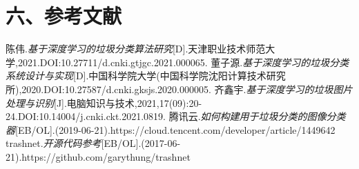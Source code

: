 \documentclass[12pt, a4paper, oneside]{ctexart}
\begin{document}
\newpage
\begingroup
\section*{六、参考文献}
\renewcommand{\section}[2]{}
\begin{thebibliography}{99}
    \addtolength{\itemsep}{-1.5ex}
    陈伟.\emph{基于深度学习的垃圾分类算法研究}[D].天津职业技术师范大学,2021.DOI:10.27711/d.cnki.gtjgc.2021.000065.
    董子源.\emph{基于深度学习的垃圾分类系统设计与实现}[D].中国科学院大学(中国科学院沈阳计算技术研究所),2020.DOI:10.27587/d.cnki.gksjs.2020.000005.
    齐鑫宇.\emph{基于深度学习的垃圾图片处理与识别}[J].电脑知识与技术,2021,17(09):20-24.DOI:10.14004/j.cnki.ckt.2021.0819.
    腾讯云.\emph{如何构建用于垃圾分类的图像分类器}[EB/OL].(2019-06-21).https://cloud.tencent.com/developer/article/1449642
    trashnet.\emph{开源代码参考}[EB/OL].(2017-06-21).https://github.com/garythung/trashnet
\end{thebibliography}
\end{document}
